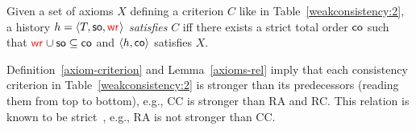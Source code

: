 \begin{definition}
 Given a set of axioms $X$ defining a criterion $C$ like in Table~\ref{weakconsistency:2}, a history ${h}={\left\langle{T, \mathsf{so}, \textcolor{red}{\mathsf{wr}_{}}}\right\rangle}$ \emph{satisfies} $C$ iff there exists a strict total order $\mathsf{co}$ such that $\textcolor{red}{\mathsf{wr}_{}}\cup\mathsf{so}\subseteq \mathsf{co}$ and ${\left\langle{h,\mathsf{co}}\right\rangle}$ satisfies $X$.
 \label{axiom-criterion}
\end{definition}

Definition~\ref{axiom-criterion} and Lemma~\ref{axioms-rel} imply that each consistency criterion in Table~\ref{weakconsistency:2} is stronger than its predecessors (reading them from top to bottom), e.g., CC is stronger than RA and RC. This relation is known to be strict~\cite{DBLP:conf/concur/Cerone0G15}, e.g., RA is not stronger than CC. 





